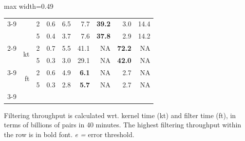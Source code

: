 \begin{table}[!htbp]
\begin{adjustbox}{max width=0.49\textwidth}
\begin{tabular}{lcc|rr|rr|rr}
\cline{3-9}
                                                        &  \rule{0pt}{2ex} \multirow{2}{*}{ft}                     & 2                               & 0.6                                   & 6.5                                     & 7.7                                  & \textbf{39.2}                       & 3.0                                  & 14.4                                \\
                                                        &                                         & 5                               & 0.4                                   & 3.7                                     & 7.6                                  & \textbf{37.8}                       & 2.9                                  & 14.2                                \\ 
\cline{2-9}
\multicolumn{1}{r}{\multirow{4}{*}{Setup\_2}}  \rule{0pt}{2ex}& \multicolumn{1}{r}{\multirow{2}{*}{kt}} & 2                               & 0.7                                   & 5.5                                     & 41.1                                 & NA                                  & \textbf{72.2}                        & NA                                  \\
\multicolumn{1}{r}{}                                    & \multicolumn{1}{r}{}                    & 5                               & 0.3                                   & 3.0                                     & 29.1                                 & NA                                  & \textbf{42.0}                        & NA                                  \\ 
\cline{3-9}
\multicolumn{1}{r}{}             \rule{0pt}{2ex}                        & \multicolumn{1}{r}{\multirow{2}{*}{ft}} & 2                               & 0.6                                   & 4.9                                     & \textbf{6.1}                         & NA                                  & 2.7                                  & NA                                  \\
\multicolumn{1}{r}{}                                    & \multicolumn{1}{r}{}                    & 5                               & 0.3                                   & 2.8                                     & \textbf{5.7}                         & NA                                  & 2.7                                  & NA                                  \\
\cline{3-9}
\end{tabular}
\end{adjustbox}
\begin{minipage}{0.49\textwidth}
\vspace*{0.2cm}
\scriptsize
Filtering throughput is calculated wrt. kernel time (kt) and filter time (ft), in terms of billions of pairs in 40 minutes. The highest filtering throughput within the row is in bold font. \textit{e = }error threshold.
\end{minipage}
\end{table}

